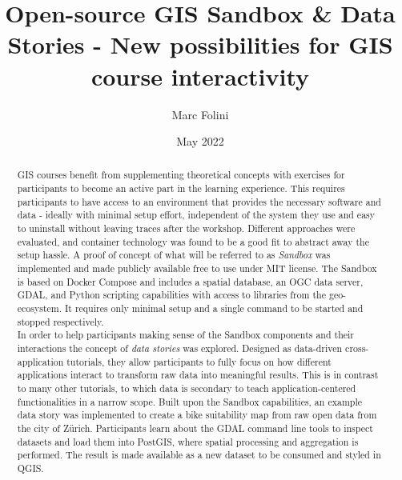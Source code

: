 \documentclass[11pt, a4paper, oneside, parskip=full-]{scrartcl}
\title{Open-source GIS Sandbox \& Data Stories - New possibilities for GIS course interactivity}
\author{Marc Folini}
\date{May 2022}
\begin{document}
\begin{titlepage}
\setcounter{page}{1}
\clearpage\maketitle
\thispagestyle{empty}
\begin{abstract}
GIS courses benefit from supplementing theoretical concepts with exercises for
participants to become an active part in the learning experience. This requires
participants to have access to an environment that provides the necessary
software and data - ideally with minimal setup effort, independent of the system
they use and easy to uninstall without leaving traces after the workshop.
Different approaches were evaluated, and container technology was found to be a
good fit to abstract away the setup hassle. A proof of concept of what will be
referred to as \emph{Sandbox} was implemented and made publicly available free
to use under MIT license. The Sandbox is based on Docker Compose and includes a
spatial database, an OGC data server, GDAL, and Python scripting capabilities
with access to libraries from the geo-ecosystem. It requires only minimal setup
and a single command to be started and stopped respectively.\\

In order to help participants making sense of the Sandbox components and their
interactions the concept of \emph{data stories} was explored. Designed as
data-driven cross-application tutorials, they allow participants to fully focus
on how different applications interact to transform raw data into meaningful
results. This is in contrast to many other tutorials, to which data is secondary
to teach application-centered functionalities in a narrow scope. Built upon the
Sandbox capabilities, an example data story was implemented to create a bike
suitability map from raw open data from the city of Zürich. Participants learn
about the GDAL command line tools to inspect datasets and load them into
PostGIS, where spatial processing and aggregation is performed. The result is
made available as a new dataset to be consumed and styled in QGIS.
\end{abstract}
\end{titlepage}

\newpage
\tableofcontents

\newpage
{}
\setcounter{page}{1}
\end{document}
